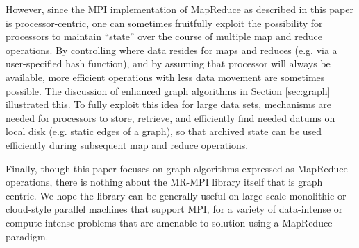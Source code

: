 However, since the MPI implementation of MapReduce as
described in this paper is processor-centric, one can sometimes
fruitfully exploit the possibility for processors to maintain
``state'' over the course of multiple map and reduce operations.  By
controlling where data resides for maps and reduces (e.g. via a
user-specified hash function), and by assuming that processor will
always be available, more efficient operations with less data movement
are sometimes possible.  The discussion of enhanced graph algorithms
in Section \ref{sec:graph} illustrated this.  To fully exploit this
idea for large data sets, mechanisms are needed for processors to
store, retrieve, and efficiently find needed datums on local disk
(e.g. static edges of a graph), so that archived state can be used
efficiently during subsequent map and reduce operations.

Finally, though this paper focuses on graph algorithms expressed as
MapReduce operations, there is nothing about the MR-MPI library itself
that is graph centric.  We hope the library can be generally useful on
large-scale monolithic or cloud-style parallel machines that support
MPI, for a variety of data-intense or compute-intense problems that
are amenable to solution using a MapReduce paradigm.
